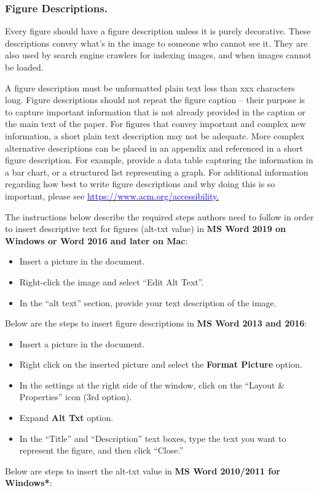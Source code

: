 \documentclass[conference]{IEEEtran}
\begin{document}
\subsubsection{Figure Descriptions.}

Every figure should have a figure description unless it is purely decorative. These descriptions convey what’s in the image to someone who cannot see it. They are also used by search engine crawlers for indexing images, and when images cannot be loaded. 

A figure description must be unformatted plain text less than xxx characters long.  Figure descriptions should not repeat the figure caption – their purpose is to capture important information that is not already provided in the caption or the main text of the paper. For figures that convey important and complex new information, a short plain text description may not be adequate. More complex alternative descriptions can be placed in an appendix and referenced in a short figure description. For example, provide a data table capturing the information in a bar chart, or a structured list representing a graph.  For additional information regarding how best to write figure descriptions and why doing this is so important, please see \href{https://www.acm.org/accessibility}{\textcolor{blue}{https://www.acm.org/accessibility.}}

The instructions below describe the required steps authors need to follow in order to insert descriptive text for figures (alt-txt value) in \textbf{MS Word 2019 on Windows or Word 2016 and later on Mac}:

\begin{itemize}
\item Insert a picture in the document.
\item Right-click the image and select “Edit Alt Text”. 
\item In the “alt text” section, provide your text description of the image.  
\end{itemize}
Below are the steps to insert figure descriptions in \textbf{MS Word 2013 and 2016}:

\begin{itemize}
\item Insert a picture in the document.
\item Right click on the inserted picture and select the \textbf{Format Picture} option.
\item In the settings at the right side of the window, click on the “Layout \& Properties” icon (3rd option). 
\item Expand \textbf{Alt Txt} option.
\item In the “Title” and “Description” text boxes, type the text you want to represent the figure, and then click “Close.”
\end{itemize}
Below are steps to insert the alt-txt value in \textbf{MS Word 2010/2011 for Windows*}:
\end{document}
